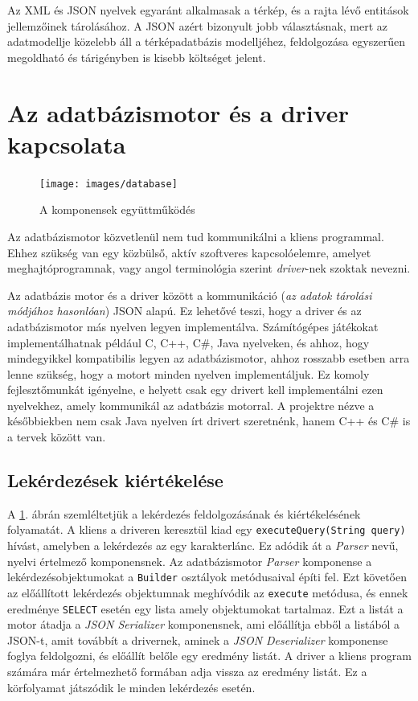 Az XML és JSON nyelvek egyaránt alkalmasak a térkép, és a rajta lévő entitások jellemzőinek tárolásához. A JSON azért bizonyult jobb választásnak, mert az adatmodellje közelebb áll a térképadatbázis modelljéhez, feldolgozása egyszerűen megoldható és tárigényben is kisebb költséget jelent.

\section{Az adatbázismotor és a driver kapcsolata}

\begin{figure}[htb]
	\begin{center}
		\texttt{[image: images/database]}
		\caption{A komponensek együttműködés}
		\label{fig:database}
	\end{center}
\end{figure}

Az adatbázismotor közvetlenül nem tud kommunikálni a kliens programmal. Ehhez szükség van egy közbülső, aktív szoftveres kapcsolóelemre, amelyet meghajtóprogramnak, vagy angol terminológia szerint \textit{driver}-nek szoktak nevezni.

Az adatbázis motor és a driver között a kommunikáció (\textit{az adatok tárolási módjához hasonlóan}) JSON alapú. Ez lehetővé teszi, hogy a driver és az adatbázismotor más nyelven legyen implementálva. Számítógépes játékokat implementálhatnak például C, C++, C\#, Java nyelveken, és ahhoz, hogy mindegyikkel kompatibilis legyen az adatbázismotor, ahhoz rosszabb esetben arra lenne szükség, hogy a motort minden nyelven implementáljuk. Ez komoly fejlesztőmunkát igényelne, e helyett csak egy drivert kell implementálni ezen nyelvekhez, amely kommunikál az adatbázis motorral. A projektre nézve a későbbiekben nem csak Java nyelven írt drivert szeretnénk, hanem C++ és C\# is a tervek között van.

\subsection{Lekérdezések kiértékelése}

A \ref{fig:database}. ábrán szemléltetjük a lekérdezés feldolgozásának és kiértékelésének folyamatát. A kliens a driveren keresztül kiad egy \texttt{executeQuery(String query)} hívást, amelyben a lekérdezés az egy karakterlánc. Ez adódik át a \textit{Parser} nevű, nyelvi értelmező komponensnek. Az adatbázismotor \textit{Parser} komponense a lekérdezésobjektumokat a \texttt{Builder} osztályok metódusaival építi fel. Ezt követően az előállított lekérdezés objektumnak meghívódik az \texttt{execute} metódusa, és ennek eredménye \texttt{SELECT} esetén egy lista amely objektumokat tartalmaz. Ezt a listát a motor átadja a \textit{JSON Serializer} komponensnek, ami előállítja ebből a listából a JSON-t, amit továbbít a drivernek, aminek a \textit{JSON Deserializer} komponense foglya feldolgozni, és előállít belőle egy eredmény listát. A driver a kliens program számára már értelmezhető formában adja vissza az eredmény listát. Ez a körfolyamat játszódik le minden lekérdezés esetén.

